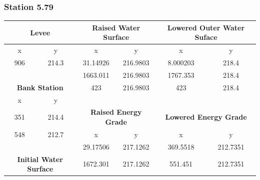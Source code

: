     \subsubsection{Station 5.79}
\begin{center}
\begin{tabular}{|cc|cc|cc|} 
    \hline
    \multicolumn{2}{|c|}{\textbf{Levee }}                    & \multicolumn{2}{c|}{\textbf{Raised Water Surface }}  & \multicolumn{2}{c|}{\textbf{Lowered Outer Water Suface }}  \\ 
    \hline
    x        & y                                             & x        & y                                         & x        & y                                               \\
    906      & 214.3                                         & 31.14926 & 216.9803                                  & 8.000203 & 218.4                                           \\
             &                                               & 1663.011 & 216.9803                                  & 1767.353 & 218.4                                           \\
    \multicolumn{2}{|c|}{\textbf{Bank Station }}             & 423      & 216.9803                                  & 423      & 218.4                                           \\ 
    \cline{1-2}
    x        & y                                             &          &                                           &          &                                                 \\
    351      & 214.4                                         & \multicolumn{2}{c|}{\textbf{Raised Energy Grade }}   & \multicolumn{2}{c|}{\textbf{Lowered Energy Grade }}        \\ 
    \cline{3-6}
    548      & 212.7                                         & x        & y                                         & x        & y                                               \\
             &                                               & 29.17506 & 217.1262                                  & 369.5518 & 212.7351                                        \\
    \multicolumn{2}{|c|}{\textbf{Initial Water Surface }}    & 1672.301 & 217.1262                                  & 551.451  & 212.7351                                        \\ 

\end{tabular}
\end{center}
